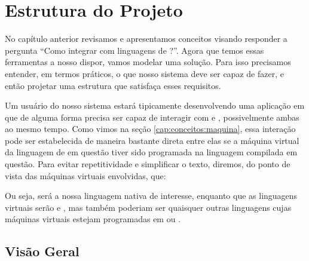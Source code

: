 \chapter{Estrutura do Projeto}
\label{cap:estrutura}

\setcounter{defcnt}{0}

  No capítulo anterior revisamos e apresentamos conceitos visando responder a
  pergunta ``Como integrar \CXX{} com linguagens de \script{}?''. Agora que
  temos essas ferramentas a nosso dispor, vamos modelar uma solução. Para isso
  precisamos entender, em termos práticos, o que nosso sistema deve ser capaz
  de fazer, e então projetar uma estrutura que satisfaça esses requisitos.
  
  Um usuário do nosso sistema estará tipicamente desenvolvendo uma aplicação
  em \CXX{} que de alguma forma precisa ser capaz de interagir com 
  e , possivelmente ambas ao mesmo tempo. Como vimos na seção
  \ref{cap:conceitos:maquina}, essa interação pode ser estabelecida de maneira
  bastante direta entre elas se a máquina virtual da linguagem de \script{} em
  questão tiver sido programada na linguagem compilada em questão. Para evitar
  repetitividade e simplificar o texto, diremos, do ponto de vista das
  máquinas virtuais envolvidas, que:


  Ou seja, \CXX{} será a nossa linguagem nativa de interesse, enquanto que
  as linguagens virtuais serão  e , mas também poderiam
  ser quaisquer outras linguagens cujas máquinas virtuais estejam programadas em
  \C{} ou \CXX{}.

  \section{Visão Geral}
  \label{cap:estrutura:geral}

